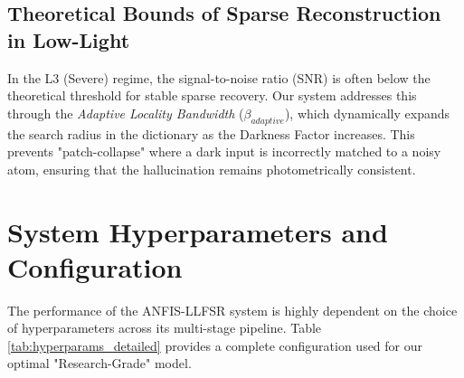 \subsection{Theoretical Bounds of Sparse Reconstruction in Low-Light}
In the L3 (Severe) regime, the signal-to-noise ratio (SNR) is often below the theoretical threshold for stable sparse recovery. Our system addresses this through the \textit{Adaptive Locality Bandwidth} ($\beta_{adaptive}$), which dynamically expands the search radius in the dictionary as the Darkness Factor increases. This prevents "patch-collapse" where a dark input is incorrectly matched to a noisy atom, ensuring that the hallucination remains photometrically consistent.
    

\section{System Hyperparameters and Configuration}
The performance of the ANFIS-LLFSR system is highly dependent on the choice of hyperparameters across its multi-stage pipeline. Table \ref{tab:hyperparams_detailed} provides a complete configuration used for our optimal "Research-Grade" model.

